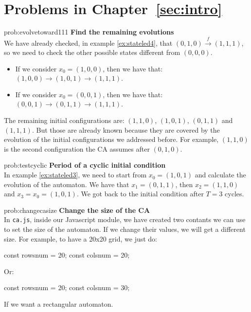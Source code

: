 %


\section*{Problems in Chapter~\ref{sec:intro}}

\begin{sol}{prob:evolvetoward111}
\textbf{Find the remaining evolutions}\\
We have already checked, in example \ref{ex:stateled4}, that
$(0,1,0) \overset{f}{\rightarrow} (1,1,1)$, so we need to check the other possible
states different from $(0,0,0)$.
\begin{itemize}
\item If we consider $x_0 = (1,0,0)$, then we have that: $(1,0,0) \rightarrow (1,0,1) \rightarrow (1,1,1)$.
\item If we consider $x_0 = (0,0,1)$, then we have that: $(0,0,1) \rightarrow (0,1,1) \rightarrow (1,1,1)$.
\end{itemize}
The remaining initial configurations are: $(1,1,0)$, $(1,0,1)$, $(0,1,1)$ and $(1,1,1)$. But those are already
known because they are covered by the evolution of the initial configurations we addressed before. For example,
$(1,1,0)$ is the second configuration the CA assumes after $(0,1,0)$.
\end{sol}


\begin{sol}{prob:testcyclic}
\textbf{Period of a cyclic initial condition}\\
In example \ref{ex:stateled3}, we need to start from $x_0 = (1,0,1)$ and calculate the evolution of the automaton.
We have that $x_1 = (0,1,1)$, then $x_2 = (1,1,0)$ and $x_3 = x_ 0 = (1,0,1)$. We got back to the initial
condition after $T=3$ cycles.
\end{sol}

\begin{sol}{prob:changecasize}
\textbf{Change the size of the CA}\\
In \texttt{ca.js}, inside our Javascript module, we have created two contants we can use to set the size of the
automaton. If we change their values, we will get a different size. For example, to have a 20x20 grid,
we just do:
\begin{code}
const rowsnum = 20;
const colsnum = 20;
\end{code}
Or:
\begin{code}
const rowsnum = 20;
const colsnum = 30;
\end{code}
If we want a rectangular automaton.
\end{sol}

